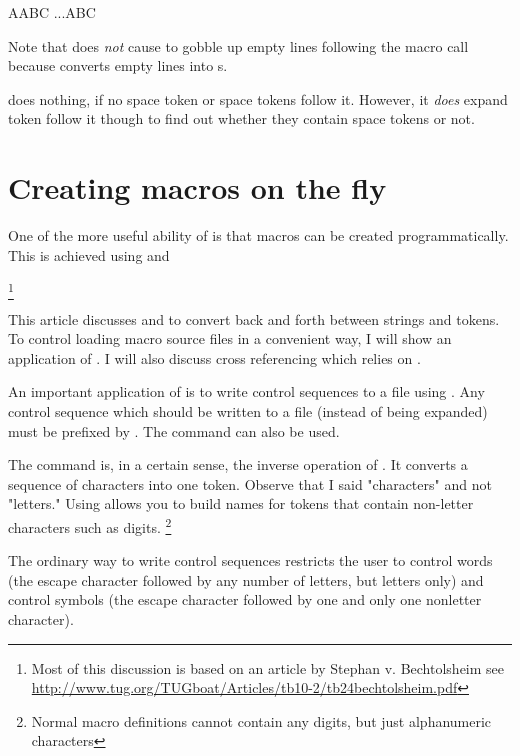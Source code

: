\bgroup
\def\\{A\ignorespaces}
\def\yy{...\ignorespaces}

\\ABC
\yy{a}\ignorespaces ABC
\egroup

Note that \cmd{\ignorespaces} does \emph{not} cause \tex to gobble up empty lines following the macro call because \tex converts empty lines into s. 

\cmd{\ignorespaces} does nothing, if no space token or space tokens follow it.  However, it \emph{does} expand token follow it though to find out whether they contain space tokens or not.

\section{Creating macros on the fly}


One of the more useful ability of \tex is that macros can be created programmatically. This is achieved using \cmd{\string} and \cmd{\csname}

\footnote{Most of this discussion is based on an article by Stephan v. Bechtolsheim see \url{http://www.tug.org/TUGboat/Articles/tb10-2/tb24bechtolsheim.pdf}}

This article discusses \cmd{\string} and \cmd{\csname} to
convert back and forth between strings and tokens.
To control loading macro source files in a convenient
way, I will show an application of \cmd{\csname}. I
will also discuss cross referencing which relies on
\cmd{\csname}.


An important application of \cmd{\string} is to
write control sequences to a file using \cmd{\write}.
Any control sequence which should be written
to a file (instead of being expanded) must be
prefixed by \cmd{\string}. The command \cmd{\noexpand} can also be used.

\CMDI{\csname}

The \cmd{\csname} command
is, in a certain sense, the inverse operation of
\cmd{\string}. It converts a sequence of characters into
one token. Observe that I said "characters" and
not "letters." Using \texttt{\string\csname} allows you to build
names for tokens that contain { non-letter characters}
such as digits. \footnote{Normal macro definitions cannot contain any digits, but just alphanumeric characters}

The ordinary way to write control
sequences restricts the user to control words (the
escape character followed by any number of letters,
but letters only) and control symbols (the escape
character followed by one and only one nonletter
character).


